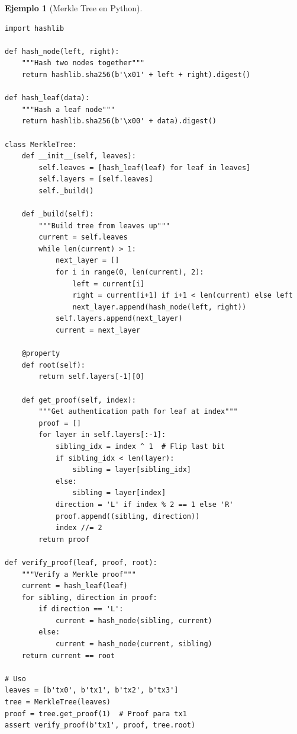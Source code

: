 \documentclass[11pt,a4paper,twoside,openright]{book}
\theoremstyle{definition}
\newtheorem{example}{Ejemplo}[chapter]
\theoremstyle{plain}
\theoremstyle{remark}
\begin{document}
\begin{example}[Merkle Tree en Python]
\begin{verbatim}
import hashlib

def hash_node(left, right):
    """Hash two nodes together"""
    return hashlib.sha256(b'\x01' + left + right).digest()

def hash_leaf(data):
    """Hash a leaf node"""
    return hashlib.sha256(b'\x00' + data).digest()

class MerkleTree:
    def __init__(self, leaves):
        self.leaves = [hash_leaf(leaf) for leaf in leaves]
        self.layers = [self.leaves]
        self._build()
    
    def _build(self):
        """Build tree from leaves up"""
        current = self.leaves
        while len(current) > 1:
            next_layer = []
            for i in range(0, len(current), 2):
                left = current[i]
                right = current[i+1] if i+1 < len(current) else left
                next_layer.append(hash_node(left, right))
            self.layers.append(next_layer)
            current = next_layer
    
    @property
    def root(self):
        return self.layers[-1][0]
    
    def get_proof(self, index):
        """Get authentication path for leaf at index"""
        proof = []
        for layer in self.layers[:-1]:
            sibling_idx = index ^ 1  # Flip last bit
            if sibling_idx < len(layer):
                sibling = layer[sibling_idx]
            else:
                sibling = layer[index]
            direction = 'L' if index % 2 == 1 else 'R'
            proof.append((sibling, direction))
            index //= 2
        return proof

def verify_proof(leaf, proof, root):
    """Verify a Merkle proof"""
    current = hash_leaf(leaf)
    for sibling, direction in proof:
        if direction == 'L':
            current = hash_node(sibling, current)
        else:
            current = hash_node(current, sibling)
    return current == root

# Uso
leaves = [b'tx0', b'tx1', b'tx2', b'tx3']
tree = MerkleTree(leaves)
proof = tree.get_proof(1)  # Proof para tx1
assert verify_proof(b'tx1', proof, tree.root)
\end{verbatim}
\end{example}
\end{document}
